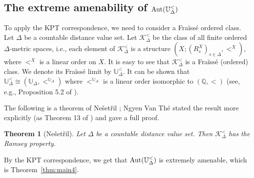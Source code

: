 \documentclass{amsart}
\newtheorem{theorem}{Theorem}[section]
\theoremstyle{definition}
\theoremstyle{remark}
\begin{document}
\subsection{The extreme amenability of $\mbox{\rm Aut}(\mathbb{U}_\Delta^<)$} 
        
    To apply the KPT correspondence, we need to consider a Fra\"iss\'e ordered class. Let $\Delta$ be a countable distance value set. Let $\mathcal{K}_\Delta^<$ be the class of all finite ordered $\Delta$-metric spaces, i.e., each element of $\mathcal{K}_\Delta^<$ is a structure $(X; (R_s^X)_{s\in \Delta}, <^X)$, where $<^X$ is a linear order on $X$. %
It is easy to see that $\mathcal{K}_\Delta^<$ is a Fra\"iss\'e (ordered) class. We denote its Fra\"iss\'e limit by $\mathbb{U}_\Delta^<$. It can be shown that $\mathbb{U}_\Delta^< \cong (\mathbb{U}_\Delta, <^{\mathbb{U}_\Delta})$ where $<^{\mathbb{U}_\Delta}$ is a linear order isomorphic to $(\mathbb{Q}, <)$ (see, e.g., Proposition 5.2 of \cite{KPT}). 

The following is a theorem of Ne\v{s}et\v{r}il \cite{Nes07}; Ngyen Van Th\'e \cite{NVTMAMS} stated the result more explicitly (as Theorem 13 of \cite{NVTMAMS}) and gave a full proof. 
    
\begin{theorem}[Ne\v{s}et\v{r}il] \label{thm:eaK<} Let $\Delta$ be a countable distance value set. Then $\mathcal{K}_\Delta^<$ has the Ramsey property.
\end{theorem}

By the KPT correspondence, we get that $\mbox{\rm Aut}(\mathbb{U}_\Delta^<)$ is extremely amenable, which is Theorem~\ref{thm:main4}.

\end{document}
